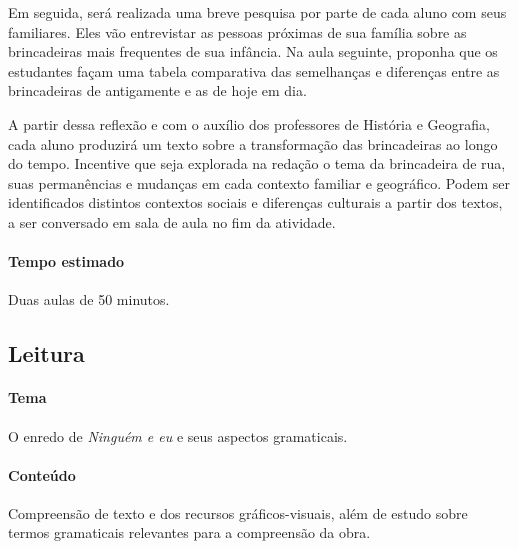 \documentclass[11pt]{extarticle}
\begin{document}
Em seguida, será realizada uma breve pesquisa por parte de cada aluno com seus familiares. Eles vão entrevistar as pessoas próximas de sua família sobre as brincadeiras mais frequentes de sua infância. Na aula seguinte, proponha que os estudantes façam uma tabela comparativa das semelhanças e diferenças entre as brincadeiras de antigamente e as de hoje em dia.


A partir dessa reflexão e com o auxílio dos professores de História e Geografia, cada aluno produzirá um texto sobre a transformação das brincadeiras ao longo do tempo. Incentive que seja explorada na redação o tema da brincadeira de rua, suas permanências e mudanças em cada contexto familiar e geográfico. Podem ser identificados distintos contextos sociais e diferenças culturais a partir dos textos, a ser conversado em sala de aula no fim da atividade.

\paragraph{Tempo estimado} Duas aulas de 50 minutos.

\subsection{Leitura}


\paragraph{Tema} O enredo de \textit{Ninguém e eu} e seus aspectos gramaticais.

\paragraph{Conteúdo} Compreensão de texto e dos recursos gráficos-visuais, além de estudo sobre termos gramaticais relevantes para a compreensão da obra.
\end{document}
